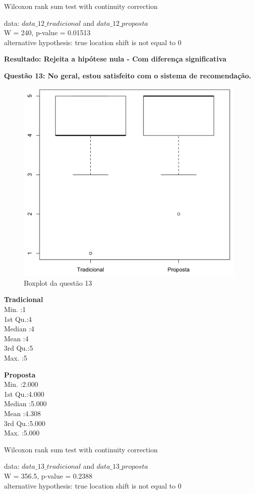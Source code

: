 Wilcoxon rank sum test with continuity correction

\noindent
data:  $data\_12\_tradicional$ and $data\_12\_proposta$\\
W = 240, p-value = 0.01513\\
alternative hypothesis: true location shift is not equal to 0

\textbf{Resultado: Rejeita a hipótese nula - Com diferença significativa}

\newpage
\textbf{Questão 13: No geral, estou satisfeito com o sistema de recomendação.}

\begin{figure}[htb]
  \caption{\label{fig:questao13-boxplot}Boxplot da questão 13}
  \begin{center}
      \includegraphics[scale=0.4]{./Figuras/questao13-boxplot.png}
  \end{center}
\end{figure}

\begin{multicols}{2}

\noindent\textbf{Tradicional}\\
Min.   :1\\
1st Qu.:4\\
Median :4\\
Mean   :4\\
3rd Qu.:5\\
Max.   :5\\
\columnbreak

\noindent\textbf{Proposta}\\
Min.   :2.000\\
1st Qu.:4.000\\
Median :5.000\\
Mean   :4.308\\
3rd Qu.:5.000\\
Max.   :5.000
\end{multicols}

Wilcoxon rank sum test with continuity correction

\noindent
data:  $data\_13\_tradicional$ and $data\_13\_proposta$\\
W = 356.5, p-value = 0.2388\\
alternative hypothesis: true location shift is not equal to 0
